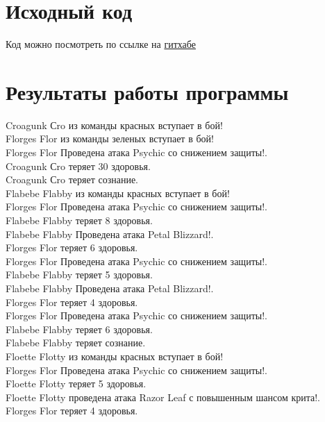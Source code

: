 \section{Исходный код}
Код можно посмотреть по ссылке на \href{https://github.com/evgrart/1year/tree/main/Lab2/src}{гитхабе}
\section{Результаты работы программы}
Croagunk Сro из команды красных вступает в бой! \\
Florges Flor из команды зеленых вступает в бой! \\
Florges Flor Проведена атака Psychic со снижением защиты!. \\
Croagunk Сro теряет 30 здоровья. \\
Croagunk Сro теряет сознание. \\
Flabebe Flabby из команды красных вступает в бой! \\
Florges Flor Проведена атака Psychic со снижением защиты!. \\
Flabebe Flabby теряет 8 здоровья. \\

\noindent Flabebe Flabby Проведена атака Petal Blizzard!. \\
Florges Flor теряет 6 здоровья. \\

\noindent Florges Flor Проведена атака Psychic со снижением защиты!. \\ 
Flabebe Flabby теряет 5 здоровья. \\

\noindent Flabebe Flabby Проведена атака Petal Blizzard!. \\
Florges Flor теряет 4 здоровья. \\

\noindent Florges Flor Проведена атака Psychic со снижением защиты!. \\
Flabebe Flabby теряет 6 здоровья. \\
Flabebe Flabby теряет сознание. \\
Floette Flotty из команды красных вступает в бой! \\
Florges Flor Проведена атака Psychic со снижением защиты!. \\
Floette Flotty теряет 5 здоровья. \\

\noindent Floette Flotty проведена атака Razor Leaf с повышенным шансом крита!.  \\
Florges Flor теряет 4 здоровья. \\

